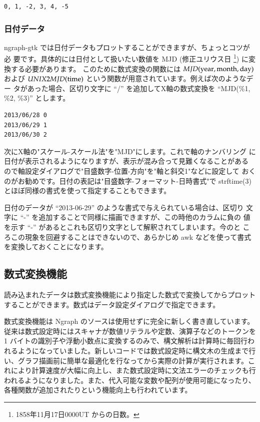 \documentclass[mingoth,a4paper,twoside]{jsarticle}
\begin{document}
\begin{verbatim}
0, 1, -2, 3, 4, -5
\end{verbatim}


\subsubsection{日付データ}

ngraph-gtk では日付データもプロットすることができますが、ちょっとコツが必
要です。具体的には日付として扱いたい数値を MJD (修正ユリウス日
\footnote{1858年11月17日0000UT からの日数。}) に変換する必要があります。
このために数式変換の関数には $MJD({\rm year, month, day})$ および
$UNIX2MJD({\rm time})$ という関数が用意されています。例えば次のようなデー
タがあった場合、区切り文字に ``/'' を追加してX軸の数式変換を ``MJD(\%1,
\%2, \%3)'' とします。

\begin{verbatim}
2013/06/28 0
2013/06/29 1
2013/06/30 2
\end{verbatim}

次にX軸の"スケール-スケール法"を"MJD"にします。これで軸のナンバリング
に日付が表示されるようになりますが、表示が混み合って見難くなることがある
ので軸設定ダイアログで"目盛数字-位置-方向"を"軸と斜交1"などに設定して
おくのがお勧めです。日付の表記は"目盛数字-フォーマット-日時書式"で
strftime(3) とほぼ同様の書式を使って指定することもできます。

日付のデータが ``2013-06-29'' のような書式で与えられている場合は、区切り
文字に ``-'' を追加することで同様に描画できますが、この時他のカラムに負の
値を示す ``-'' があるとこれも区切り文字として解釈されてしまいます。今のと
ころこの現象を回避することはできないので、あらかじめ awk などを使って書式
を変換しておくことになります。

\subsection{数式変換機能}

読み込まれたデータは数式変換機能により指定した数式で変換してからプロット
することができます。数式はデータ設定ダイアログで指定できます。

数式変換機能は Ngraph のソースは使用せずに完全に新しく書き直しています。
従来は数式設定時にはスキャナが数値リテラルや定数、演算子などのトークンを
1 バイトの識別子や浮動小数点に変換するのみで、構文解析は計算時に毎回行わ
れるようになっていました。新しいコードでは数式設定時に構文木の生成まで行
い、グラフ描画前に簡単な最適化を行なってから実際の計算が実行されます。こ
れにより計算速度が大幅に向上し、また数式設定時に文法エラーのチェックも行
われるようになりました。また、代入可能な変数や配列が使用可能になったり、
各種関数が追加されたりという機能向上も行われています。
\end{document}
